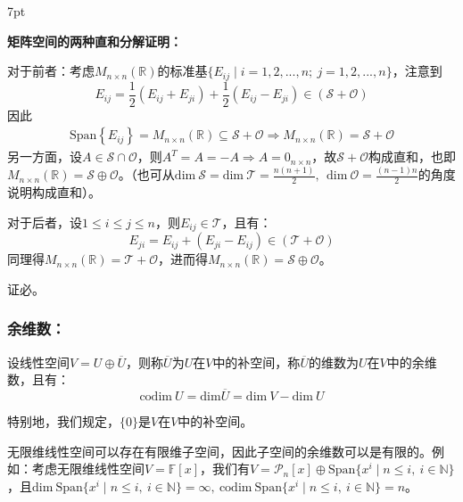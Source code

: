 \documentclass[zihao=5,UTF8]{report}
\theoremstyle{mystyle} %
\newenvironment{graybox}{%
\def\FrameCommand{%
\hspace{1pt}%
{\color{gray}\small \vrule width 2pt}%
{\color{graybox_color}\vrule width 4pt}%
\colorbox{graybox_color}%
}%
\MakeFramed{\advance\hsize-\width\FrameRestore}%
\noindent\hspace{-4.55pt}%
\begin{adjustwidth}{}{7pt}%
\vspace{2pt}\vspace{2pt}%
}
{%
\vspace{2pt}\end{adjustwidth}\endMakeFramed%
}
\begin{document}
\begin{enumerate}
    \begin{graybox}
        \textbf{矩阵空间的两种直和分解证明：}\par
        对于前者：考虑$M_{n\times n}(\mathbb{R})$的标准基$\{E_{ij}\mid i = 1,2,...,n;\ j = 1,2,...,n\}$，注意到
    \begin{equation*}
        E_{ij} = \frac{1}{2}(E_{ij}+E_{ji}) + \frac{1}{2}(E_{ij}-E_{ji})\in (\mathcal{S}+\mathcal{O})
    \end{equation*}
    因此
    \begin{align*}
        \text{Span} \left\{E_{ij}\right\} =  M_{n\times n}(\mathbb{R}) \subseteq \mathcal{S}+\mathcal{O}
        \Longrightarrow 
        M_{n\times n}(\mathbb{R}) =\mathcal{S}+ \mathcal{O} 
    \end{align*}
    另一方面，设$A \in \mathcal{S}\cap \mathcal{O}$，则$A^{T} = A =-A \Longrightarrow A = 0_{n\times n}$，故$\mathcal{S}+ \mathcal{O}$构成直和，也即$M_{n\times n}(\mathbb{R}) =\mathcal{S}\oplus  \mathcal{O}$。（也可从$ \text{dim}\ \mathcal{S} = \text{dim}\ \mathcal{T} = \frac{n(n+1)}{2},\ \ \text{dim}\ \mathcal{O} = \frac{(n-1)n}{2}$的角度说明构成直和）。\par
    对于后者，设$1 \le i \le j \le n$，则$E_{ij}\in \mathcal{T}$，且有：
    \begin{equation*}
        E_{ji} = E_{ij} + (E_{ji} - E_{ij}) \in (\mathcal{T} + \mathcal{O})
    \end{equation*}
    同理得$M_{n\times n}(\mathbb{R}) =\mathcal{T}+ \mathcal{O}$，进而得$M_{n\times n}(\mathbb{R}) =\mathcal{S}\oplus \mathcal{O}$。\par
    证必。
    \end{graybox}
\end{enumerate}

\subsubsection{余维数：}
    设线性空间$V = U \oplus \overline{U}$，则称$\overline{U}$为$U$在$V$中的补空间，称$\overline{U}$的维数为$U$在$V$中的余维数，且有：
    \begin{equation*}
        \text{codim}\ U = \text{dim}\overline{U} =  \text{dim}\ V - \text{dim}\  U
    \end{equation*}\par
    特别地，我们规定，$\{0\}$是$V$在$V$中的补空间。\par
    {\color{gray}\small 无限维线性空间可以存在有限维子空间，因此子空间的余维数可以是有限的。例如：考虑无限维线性空间$V = \mathbb{F}[x]$，我们有$V = \mathcal{P}_n[x]\oplus \text{Span}\{x^i\mid n\le i ,\ i \in \mathbb{N}\} $，且$\text{dim}\ \text{Span}\{x^i\mid n\le i ,\ i \in \mathbb{N}\} = \infty,\ \text{codim}\ \text{Span}\{x^i\mid n\le i ,\ i \in \mathbb{N}\} = n$。}
\end{document}
